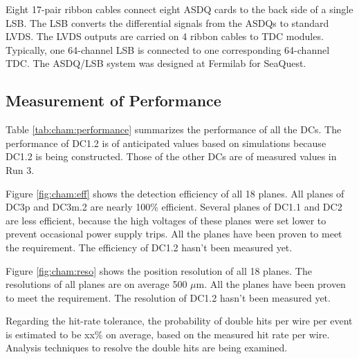 Eight 17-pair ribbon cables connect eight ASDQ cards to the back side of a single LSB.  The LSB converts the differential signals from the ASDQs to standard LVDS.  The LVDS outputs are carried on 4 ribbon cables to TDC modules.  Typically, one 64-channel LSB is connected to one corresponding 64-channel TDC. The ASDQ/LSB system was designed at Fermilab for SeaQuest.
\subsection{Measurement of Performance}

Table \ref{tab:cham:performance} summarizes the performance of all the DCs.
The performance of DC1.2 is of anticipated values based on simulations
because DC1.2 is being constructed.
Those of the other DCs are of measured values in Run 3.

Figure \ref{fig:cham:eff} shows the detection efficiency of all 18 planes.
All planes of DC3p and DC3m.2 are nearly 100\% efficient.
Several planes of DC1.1 and DC2 are less efficient,
because the high voltages of these planes were set lower
to prevent occasional power supply trips.
All the planes have been proven to meet the requirement.
The efficiency of DC1.2 hasn't been measured yet.

Figure \ref{fig:cham:reso} shows the position resolution of all 18 planes.
The resolutions of all planes are on average 500 $\mu$m.
All the planes have been proven to meet the requirement.
The resolution of DC1.2 hasn't been measured yet.

Regarding the hit-rate tolerance,
the probability of double hits per wire per event is estimated to be xx\% on average,
based on the measured hit rate per wire.
Analysis techniques to resolve the double hits are being examined.

